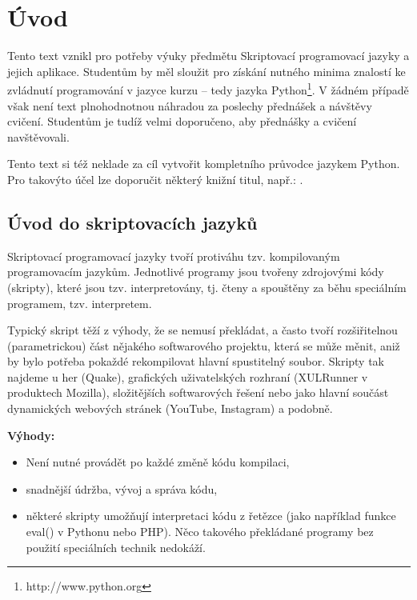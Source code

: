 \chapter{Úvod}%

Tento text vznikl pro potřeby výuky předmětu Skriptovací programovací jazyky a jejich aplikace. Studentům by měl sloužit
pro získání nutného minima znalostí ke zvládnutí programování v jazyce kurzu
-- tedy jazyka Python\footnote{http://www.python.org}. V žádném případě
však není text plnohodnotnou náhradou za poslechy přednášek a návštěvy cvičení. Studentům je tudíž velmi doporučeno, aby
přednášky a cvičení navštěvovali.



Tento text si též neklade za cíl vytvořit kompletního průvodce jazykem Python. Pro takovýto účel lze doporučit některý knižní titul, např.: \cite{harms-mcdonald}.

\section{Úvod do skriptovacích jazyků}
Skriptovací programovací jazyky tvoří protiváhu tzv. kompilovaným programovacím jazykům. Jednotlivé programy jsou tvořeny zdrojovými kódy (skripty), které jsou tzv. interpretovány, tj. čteny a spouštěny za běhu spe\-ciál\-ním programem, tzv. interpretem.

Typický skript těží z výhody, že se nemusí překládat, a často tvoří rozšiřitelnou (parametrickou) část nějakého softwarového projektu, která se může měnit, aniž by bylo potřeba pokaždé rekompilovat hlavní spustitelný soubor. Skripty tak najdeme u her (Quake), grafických uživatelských rozhraní (XULRunner v produktech Mozilla), složitějších softwarových řešení nebo jako hlavní součást dynamických webových stránek (YouTube, Instagram) a podobně.

\newpage

\noindent
{\textbf{Výhody:}}
\begin{itemize}

\item Není nutné provádět po každé změně kódu kompilaci,
\item snadnější údržba, vývoj a správa kódu,
\item některé skripty umožňují interpretaci kódu z řetězce (jako například funkce eval() v Pythonu nebo PHP). Něco takového překládané programy bez použití speciálních technik nedokáží.
\end{itemize}

